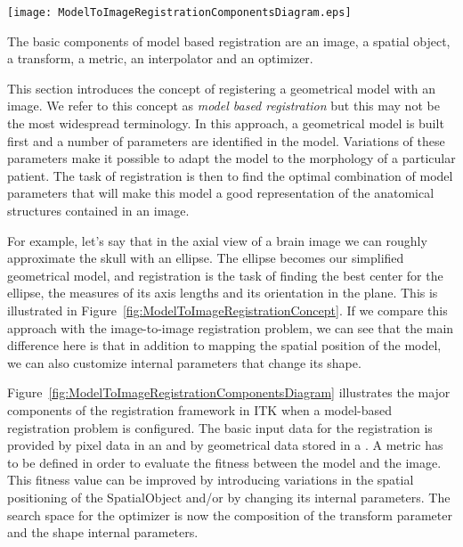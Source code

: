 %
%
%
%
%
%

\begin{floatingfigure}[rlp]{8cm}
  \centering
  \texttt{[image: ModelToImageRegistrationComponentsDiagram.eps]}
  \caption[Model to Image Registration Framework Components]{The basic
components of model based registration are an image, a spatial object, a
transform, a metric, an interpolator and an
optimizer.\label{fig:ModelToImageRegistrationComponentsDiagram}}
\end{floatingfigure}

This section introduces the concept of registering a geometrical model with
an image. We refer to this concept as \emph{model based registration} but
this may not be the most widespread terminology. In this approach, a
geometrical model is built first and a number of parameters are identified in
the model. Variations of these parameters make it possible to adapt the model
to the morphology of a particular patient. The task of registration
is then to find the optimal combination of model parameters that will
make this model a good representation of the anatomical structures
contained in an image.

For example, let's say that in the axial view of a brain image we can roughly
approximate the skull with an ellipse. The ellipse becomes our simplified
geometrical model, and registration is the task of finding the best center for
the ellipse, the measures of its axis lengths and its orientation in the plane.
This is illustrated in Figure~\ref{fig:ModelToImageRegistrationConcept}.  If we
compare this approach with the image-to-image registration problem, we can see
that the main difference here is that in addition to mapping the spatial
position of the model, we can also customize internal parameters that change
its shape.

Figure~\ref{fig:ModelToImageRegistrationComponentsDiagram}   illustrates  the
major  components of  the registration  framework in  ITK when  a  model-based
registration problem is configured. The basic input data for the registration
is  provided by  pixel data  in an   and  by  geometrical data
stored in a  . A metric has to be  defined in order to
evaluate the fitness between the model  and the image. This fitness value can
be  improved by  introducing variations  in  the spatial  positioning of  the
SpatialObject and/or  by changing its  internal parameters. The  search space
for the optimizer  is now the composition of the  transform parameter and the
shape internal parameters.

